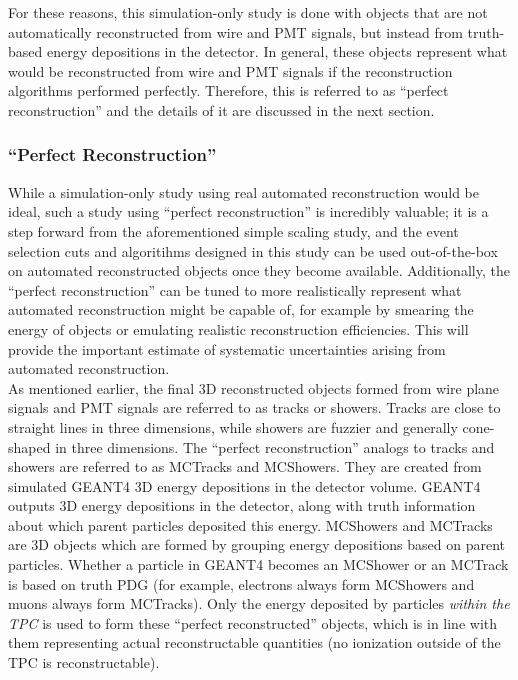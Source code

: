 For these reasons, this simulation-only study is done with objects that are not automatically reconstructed from wire and PMT signals, but instead from truth-based energy depositions in the detector. In general, these objects represent what would be reconstructed from wire and PMT signals if the reconstruction algorithms performed perfectly. Therefore, this is referred to as ``perfect reconstruction'' and the details of it are discussed in the next section. 

\subsubsection{``Perfect Reconstruction''}\label{perfectreco_section}
While a simulation-only study using real automated reconstruction would be ideal, such a study using ``perfect reconstruction'' is incredibly valuable; it is a step forward from the aforementioned simple scaling study, and the event selection cuts and algoritihms designed in this study can be used out-of-the-box on automated reconstructed objects once they become available. Additionally, the ``perfect reconstruction'' can be tuned to more realistically represent what automated reconstruction might be capable of, for example by smearing the energy of objects or emulating realistic reconstruction efficiencies. This will provide the important estimate of systematic uncertainties arising from automated reconstruction.\\

As mentioned earlier, the final 3D reconstructed objects formed from wire plane signals and PMT signals are referred to as tracks or showers. Tracks are close to straight lines in three dimensions, while showers are fuzzier and generally cone-shaped in three dimensions. The ``perfect reconstruction'' analogs to tracks and showers are referred to as {\sc MCTracks} and {\sc MCShowers}. They are created from simulated {\sc GEANT4} 3D energy depositions in the detector volume. {\sc GEANT4} outputs 3D energy depositions in the detector, along with truth information about which parent particles deposited this energy. {\sc MCShowers} and {\sc MCTracks} are 3D objects which are formed by grouping energy depositions based on parent particles. Whether a particle in {\sc GEANT4} becomes an {\sc MCShower} or an {\sc MCTrack} is based on truth PDG (for example, electrons always form {\sc MCShower}s and muons always form {\sc MCTrack}s). Only the energy deposited by particles \textit{within the TPC} is used to form these ``perfect reconstructed'' objects, which is in line with them representing actual reconstructable quantities (no ionization outside of the TPC is reconstructable).\\


